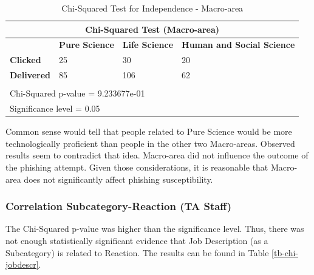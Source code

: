 \documentclass[a4paper]{article}
\begin{document}
\begingroup
\renewcommand{\arraystretch}{1.25}
\begin{table}[ht]
\begin{center}
    \begin{tabular}{ | l | l | l | l | }
    \hline
    \multicolumn{4}{|c|}{Chi-Squared Test (Macro-area)} \\ \hline
    \textbf{} & \textbf{Pure Science} & \textbf{Life Science} & \textbf{Human and Social Science} \\
    \hline
    \textbf{Clicked} & 25 & 30 & 20 \\ \hline
    \textbf{Delivered} & 85 & 106 & 62 \\ \hline
    \multicolumn{4}{l}{} \\ \hline
    \multicolumn{4}{|l|}{Chi-Squared p-value = 9.233677e-01} \\
    \multicolumn{4}{|l|}{Significance level = 0.05} \\ \hline
    \end{tabular}
\end{center}
\caption{Chi-Squared Test for Independence - Macro-area}
\label{tb-chi-macroarea}
\end{table}

\noindent
Common sense would tell that people related to Pure Science would be more technologically proficient than people in the other two Macro-areas. Observed results seem to contradict that idea. Macro-area did not influence the outcome of the phishing attempt. Given those considerations, it is reasonable that Macro-area does not significantly affect phishing susceptibility.

\newpage

\subsubsection{Correlation Subcategory-Reaction (TA Staff)}

The Chi-Squared p-value was higher than the significance level. Thus, there was not enough statistically significant evidence that Job Description (as a Subcategory) is related to Reaction. The results can be found in Table \ref{tb-chi-jobdescr}.

\bigskip
\end{document}
